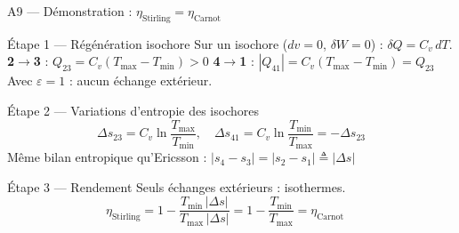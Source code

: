 \documentclass[aspectratio=43, 10pt]{beamer}
\newcommand{\Tmin}{T_{\min}}
\newcommand{\Tmax}{T_{\max}}
\newcommand{\etaC}{\eta_{\text{Carnot}}}
\begin{document}
\begin{frame}{A9 --- D\'emonstration : $\eta_{\text{Stirling}} = \etaC$}

  \begin{block}{\'Etape 1 --- R\'eg\'en\'eration isochore}
    \small
    Sur un isochore ($dv = 0$, $\delta W = 0$) : $\delta Q = C_v\,dT$.
    \textbf{2$\to$3} : $Q_{23} = C_v(\Tmax-\Tmin) > 0$\quad
    \textbf{4$\to$1} : $|Q_{41}| = C_v(\Tmax-\Tmin) = Q_{23}$
    Avec $\varepsilon = 1$ : aucun \'echange ext\'erieur.
  \end{block}

  \begin{block}{\'Etape 2 --- Variations d'entropie des isochores}
    \[
      \Delta s_{23} = C_v\ln\!\frac{\Tmax}{\Tmin}, \quad
      \Delta s_{41} = C_v\ln\!\frac{\Tmin}{\Tmax} = -\Delta s_{23}
    \]
    M\^eme bilan entropique qu'Ericsson :
    $|s_4-s_3| = |s_2-s_1| \triangleq |\Delta s|$
  \end{block}

  \begin{block}{\'Etape 3 --- Rendement}
    Seuls \'echanges ext\'erieurs : isothermes.
    \[
      \boxed{\eta_{\text{Stirling}}
             = 1 - \frac{\Tmin\,|\Delta s|}{\Tmax\,|\Delta s|}
             = 1 - \frac{\Tmin}{\Tmax}
             = \etaC}
      \quad
    \]
  \end{block}

\end{frame}
\end{document}
